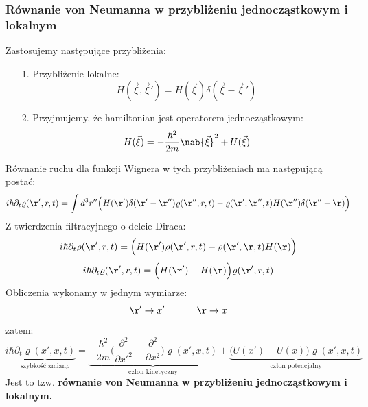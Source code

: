 \subsubsection{Równanie von Neumanna w przybliżeniu jednocząstkowym i lokalnym}
Zastosujemy następujące przybliżenia:
\begin{itemize}
\item[1.] Przybliżenie lokalne:
\begin{equation}H(\vec{\xi},\vec{\xi}')=H(\vec{\xi})\delta(\vec{\xi}-\vec{\xi}\,')
\end{equation}
\item[2.] Przyjmujemy, że hamiltonian jest operatorem jednocząstkowym:
\begin{equation}H(\vec{\xi})=-\frac{\hbar^2}{2m}\nab{\vec{\xi}}^2+U(\vec{\xi})
\end{equation}
\end{itemize}
Równanie ruchu dla funkcji Wignera w tych przybliżeniach ma następującą postać:
\begin{equation}i\hbar\partial_t\varrho(\r',r,t)=
\int d^3r''\Big(H(\r')\delta(\r'-\r'')\varrho(\r'',r,t)-
\varrho(\r',\r'',t)H(\r'')\delta(\r''-\r)\Big)
\end{equation}
Z twierdzenia filtracyjnego o delcie Diraca:
\begin{equation}i\hbar\partial_t\varrho(\r',r,t)=
\Big(H(\r')\varrho(\r',r,t)-
\varrho(\r',\r,t)H(\r)\Big)
\end{equation}
\begin{equation}i\hbar\partial_t\varrho(\r',r,t)=
\Big(H(\r')-H(\r)\Big)\varrho(\r',r,t)
\end{equation}
Obliczenia wykonamy w jednym wymiarze:
\begin{equation}\r'\rightarrow x'~~~~~~~~~~\r\rightarrow x\end{equation}
zatem:
\begin{equation}i\hbar\underbrace{\partial_t\varrho(x',x,t)}_{\text{szybkość zmian} \varrho}=
\underbrace{-\frac{\hbar^2}{2m}\Big(\frac{\partial^2}{\partial x'^2}-\frac{\partial^2}{\partial x^2}\Big)\varrho(x',x,t)}_{\text{człon kinetyczny}}
+\underbrace{\Big(U(x')-U(x)\Big)\varrho(x',x,t)}_{\text{człon potencjalny}}
\label{vonNeumann}
\end{equation}
Jest to tzw. \textbf{równanie von Neumanna w przybliżeniu jednocząstkowym i lokalnym.}\\
